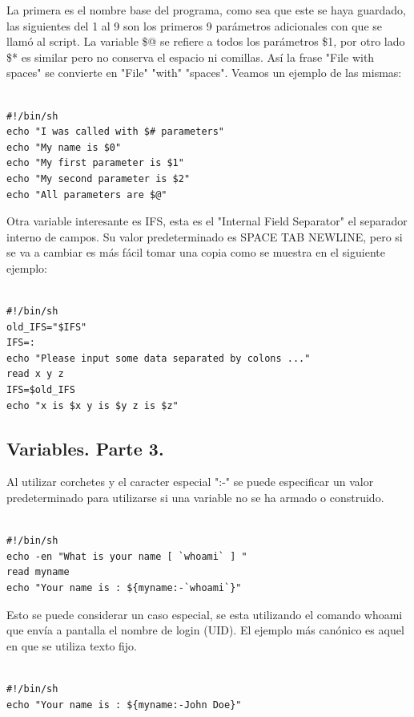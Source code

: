 \documentclass{article} %
\begin{document}
La primera es el nombre base del programa, como sea que este se haya guardado, las siguientes del 1 al 9 son los primeros 9 parámetros adicionales con que se llamó al script. La variable \$@ se refiere a todos los parámetros \$1, por otro lado \$* es similar pero no conserva el espacio ni comillas. Así la frase "File with spaces" se convierte en "File" "with" "spaces". Veamos un ejemplo de las mismas:

\begin{verbatim} 

#!/bin/sh
echo "I was called with $# parameters"
echo "My name is $0"
echo "My first parameter is $1"
echo "My second parameter is $2"
echo "All parameters are $@"

\end{verbatim}

Otra variable interesante es IFS, esta es el "Internal Field Separator" el separador interno de campos. Su valor predeterminado es SPACE TAB NEWLINE, pero si se va a cambiar es más fácil tomar una copia como se muestra en el siguiente ejemplo:

\begin{verbatim} 

#!/bin/sh
old_IFS="$IFS"
IFS=:
echo "Please input some data separated by colons ..."
read x y z
IFS=$old_IFS
echo "x is $x y is $y z is $z"

\end{verbatim}

\subsection{Variables. Parte 3.}

Al utilizar corchetes y el caracter especial ":-" se puede especificar un valor predeterminado para utilizarse si una variable no se ha armado o construido. 

\begin{verbatim} 

#!/bin/sh
echo -en "What is your name [ `whoami` ] "
read myname
echo "Your name is : ${myname:-`whoami`}"

\end{verbatim}

Esto se puede considerar un caso especial, se esta utilizando el comando whoami que envía a pantalla el nombre de login (UID). El ejemplo más canónico es aquel en que se utiliza texto fijo.

\begin{verbatim} 

#!/bin/sh
echo "Your name is : ${myname:-John Doe}"

\end{verbatim}
\end{document}
